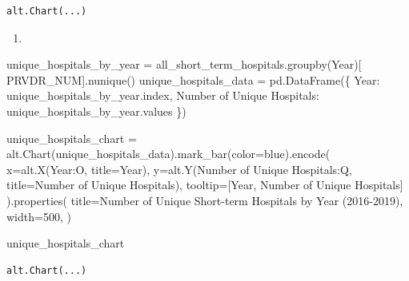 \documentclass[
  letterpaper,
  DIV=11,
  numbers=noendperiod]{scrartcl}
\newenvironment{Shaded}{\begin{snugshade}}{\end{snugshade}}
\newcommand{\DecValTok}[1]{\textcolor[rgb]{0.68,0.00,0.00}{#1}}
\newcommand{\NormalTok}[1]{\textcolor[rgb]{0.00,0.23,0.31}{#1}}
\newcommand{\OperatorTok}[1]{\textcolor[rgb]{0.37,0.37,0.37}{#1}}
\newcommand{\StringTok}[1]{\textcolor[rgb]{0.13,0.47,0.30}{#1}}
\providecommand{\tightlist}{%
  \setlength{\itemsep}{0pt}\setlength{\parskip}{0pt}}\usepackage{longtable,booktabs,array}
\begin{document}
\begin{verbatim}
alt.Chart(...)
\end{verbatim}

\begin{enumerate}
\def\labelenumi{\arabic{enumi}.}
\setcounter{enumi}{3}
\tightlist
\item
\end{enumerate}

\begin{Shaded}
\begin{Highlighting}[]
\NormalTok{unique\_hospitals\_by\_year }\OperatorTok{=}\NormalTok{ all\_short\_term\_hospitals.groupby(}\StringTok{\textquotesingle{}Year\textquotesingle{}}\NormalTok{)[}
    \StringTok{\textquotesingle{}PRVDR\_NUM\textquotesingle{}}\NormalTok{].nunique()}
\NormalTok{unique\_hospitals\_data }\OperatorTok{=}\NormalTok{ pd.DataFrame(\{}
    \StringTok{\textquotesingle{}Year\textquotesingle{}}\NormalTok{: unique\_hospitals\_by\_year.index,}
    \StringTok{\textquotesingle{}Number of Unique Hospitals\textquotesingle{}}\NormalTok{: unique\_hospitals\_by\_year.values}
\NormalTok{\})}

\NormalTok{unique\_hospitals\_chart }\OperatorTok{=}\NormalTok{ alt.Chart(unique\_hospitals\_data).mark\_bar(color}\OperatorTok{=}\StringTok{\textquotesingle{}blue\textquotesingle{}}\NormalTok{).encode(}
\NormalTok{    x}\OperatorTok{=}\NormalTok{alt.X(}\StringTok{\textquotesingle{}Year:O\textquotesingle{}}\NormalTok{, title}\OperatorTok{=}\StringTok{\textquotesingle{}Year\textquotesingle{}}\NormalTok{),}
\NormalTok{    y}\OperatorTok{=}\NormalTok{alt.Y(}\StringTok{\textquotesingle{}Number of Unique Hospitals:Q\textquotesingle{}}\NormalTok{,}
\NormalTok{            title}\OperatorTok{=}\StringTok{\textquotesingle{}Number of Unique Hospitals\textquotesingle{}}\NormalTok{),}
\NormalTok{    tooltip}\OperatorTok{=}\NormalTok{[}\StringTok{\textquotesingle{}Year\textquotesingle{}}\NormalTok{, }\StringTok{\textquotesingle{}Number of Unique Hospitals\textquotesingle{}}\NormalTok{]}
\NormalTok{).properties(}
\NormalTok{    title}\OperatorTok{=}\StringTok{\textquotesingle{}Number of Unique Short{-}term Hospitals by Year (2016{-}2019)\textquotesingle{}}\NormalTok{,}
\NormalTok{    width}\OperatorTok{=}\DecValTok{500}\NormalTok{,}
\NormalTok{)}

\NormalTok{unique\_hospitals\_chart}
\end{Highlighting}
\end{Shaded}

\begin{verbatim}
alt.Chart(...)
\end{verbatim}
\end{document}
